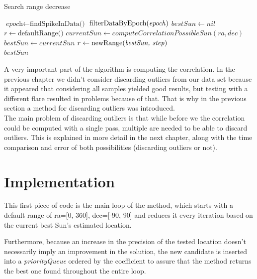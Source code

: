 \begin{algorithm}
	\caption{Search range decrease}\label{searchRangeDecrease}
	\begin{algorithmic}[1]
		\State $\textit{epoch} \gets \text{findSpikeInData()}$
		\State $\text{filterDataByEpoch(\textit{epoch})}$
		\State $bestSun \gets nil$
		\State $r \gets \text{defaultRange()}$
		\State $currentSun \gets computeCorrelationPossibleSun(ra, dec)$
		\State $bestSun \gets currentSun$
		\State $r \gets \text{newRange(\textit{bestSun, step})}$
		\EndIf
		\EndFor
		\EndFor
		\EndFor
		\\
		\Return $bestSun$
		\EndProcedure
	\end{algorithmic}
\end{algorithm}

A very important part of the algorithm is computing the correlation. In the previous chapter we didn't consider discarding outliers from our data set because it appeared that considering all samples yielded good results, but testing with a different flare resulted in problems because of that. That is why in the previous section a method for discarding outliers was introduced. \\

The main problem of discarding outliers is that while before we the correlation could be computed with a single pass, multiple are needed to be able to discard outliers.
This is explained in more detail in the next chapter, along with the time comparison and error of both possibilities (discarding outliers or not).

\section{Implementation}

This first piece of code is the main loop of the method, which starts with a default range of ra=[0, 360], dec=[-90, 90] and reduces it every iteration based on the current best Sun's estimated location.

Furthermore, because an increase in the precision of the tested location doesn't necessarily imply an improvement in the solution, the new candidate is inserted into a \textit{priorityQueue} ordered by the coefficient to assure that the method returns the best one found throughout the entire loop.

